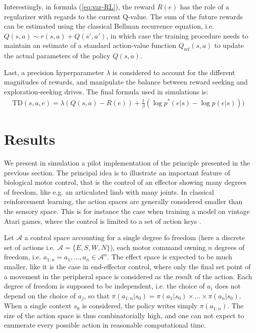 \documentclass[runningheads]{llncs}
\begin{document}
Interestingly, in formula (\ref{eq:var-RL}), the reward $R(e)$ has the role of a regularizer with regards to the current Q-value. The sum of the future rewards can be estimated using the classical Bellman recurrence equation, i.e. $Q(s,a) \sim r(s,a) + Q(s', a')$, in which case the training procedure needs to maintain an estimate of a standard action-value function $Q_\text{ref}(s,a)$ to update the actual parameters of the policy $Q(s,a)$.  

Last, a precision hyperparameter $\lambda$ is considered to account for the different magnitudes of rewards, and manipulate the balance between reward seeking and exploration-seeking drives. The final formula used in simulations is:
   \begin{align}\label{eq:var-RL-lambda}
   \text{TD}(s,a,e) = \lambda(Q(s,a) - R(e)) + \frac{1}{\beta} (\log p^*(e|s) - \log p(e|s)))
   \end{align}


\section{Results}

We present in simulation a pilot implementation of the principle presented in the previous section. The principal idea is to illustrate an important feature of biological motor control, that is the control of an effector showing many degrees of freedom, like e.g. an articulated limb with many joints. 
In classical reinforcement learning, the action spaces are generally considered smaller than the sensory space. This is for instance the case when training a model on vintage Atari games, where the control is limited to a set of action keys \cite{mnih2013playing}.

Let $\mathcal{A}$ a control space accounting for a single degree fo freedom (here a discrete set of actions i.e. $\mathcal{A}=\{E,S,W,N\}$), each motor command owning $n$ degrees of freedom, i.e. $a_{1:n} = {a_1,...,a_n} \in \mathcal{A}^n $. The effect space is expected to be much smaller, like it is the case in end-effector control, where only the final set point of a movement in the peripheral space is considered as the result of the action. Each degree of freedom is supposed to be independent, i.e. the choice of $a_i$ does not depend on the choice of $a_j$, so that $\pi(a_{1:n}|s_0) = \pi(a_1|s_0) \times ... \times \pi(a_n|s_0)$. When a single context $s_0$ is considered, the policy writes simply $\pi(a_{1:n})$.
The size of the action space is thus combinatorially high, and one can not expect to enumerate every possible action in reasonable computational time. 
\end{document}
